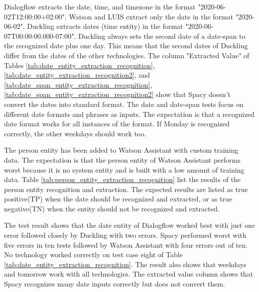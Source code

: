 Dialogflow extracts the date, time, and timezone in the format "2020-06-02T12:00:00+02:00".
Watson and LUIS extract only the date in the format "2020-06-02".
Duckling extracts dates (time entity) in the format "2020-06-07T00:00:00.000-07:00".
Duckling always sets the second date of a date-span to the recognized date plus one day.
This means that the second dates of Duckling differ from the dates of the other technologies.
The column "Extracted Value" of Tables \ref{tab:date_entity_extraction_recognition},
\ref{tab:date_entity_extraction_recognition2},
and \ref{tab:date_span_entity_extraction_recognition},
\ref{tab:date_span_entity_extraction_recognition2} show that Spacy doesn't convert the dates into standard format.
The date and date-span tests focus on different date formats and phrases as inputs.
The expectation is that a recognized date format works for all instances of the format.
If Monday is recognized correctly, the other weekdays should work too. 

The person entity has been added to Watson Assistant with custom training data.
The expectation is that the person entity of Watson Assistant performs worst because it is no system entity and is built with a low amount of training data.
Table \ref{tab:person_entity_extraction_recognition} list the results of the person entity recognition and extraction.
The expected results are listed as true positive(TP) when the date should be recognized and extracted, or as true negative(TN) when the entity should not be recognized and extracted.

The test result shows that the date entity of Dialogflow worked best with just one error followed closely by Duckling with two errors.
Spacy performed worst with five errors in ten tests followed by Watson Assistant with four errors out of ten.
No technology worked correctly on test case eight of Table \ref{tab:date_entity_extraction_recognition}.
The result also shows that weekdays and tomorrow work with all technologies.
The extracted value column shows that Spacy recognizes many date inputs correctly but does not convert them.

